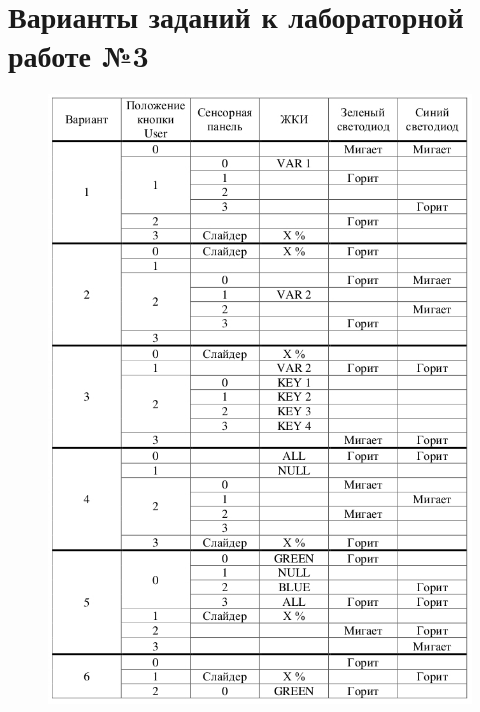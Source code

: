 \section{Варианты заданий к лабораторной работе №3}
\label{Lab3Var}
\begin{figure}[H]
\begin{center}
\includegraphics[scale=0.7]{Image/91.jpg} 
\end{center}
\end{figure}


